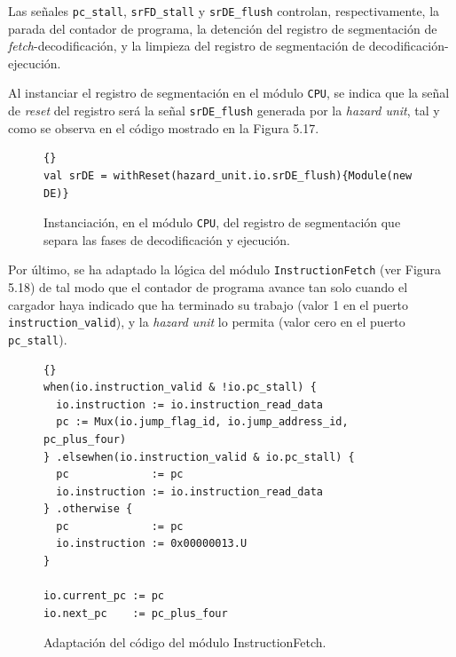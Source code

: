 Las señales \texttt{pc\_stall}, \texttt{srFD\_stall} y \texttt{srDE\_flush} controlan, respectivamente, la parada del contador de programa, la detención del registro de segmentación de \textit{fetch}-decodificación, y la limpieza del registro de segmentación de decodificación-ejecución.

Al instanciar el registro de segmentación en el módulo \texttt{CPU}, se indica que la señal de \textit{reset} del registro será la señal \texttt{srDE\_flush} generada por la \textit{hazard unit}, tal y como se observa en el código mostrado en la Figura 5.17.

\vspace{+0.4cm}
\begin{figure}[h!]
\begin{lstlisting}[style=scalaStyle,columns=fullflexible]{}
val srDE = withReset(hazard_unit.io.srDE_flush){Module(new DE)}
\end{lstlisting}
\vspace{-0.1cm}
\caption{Instanciación, en el módulo \texttt{CPU}, del registro de segmentación que separa las fases de decodificación y ejecución.}
\end{figure}

Por último, se ha adaptado la lógica del módulo \texttt{InstructionFetch} (ver Figura 5.18) de tal modo que el contador de programa avance tan solo cuando el cargador haya indicado que ha terminado su trabajo (valor 1 en el puerto \texttt{instruction\_valid}), y la \textit{hazard unit} lo permita (valor cero en el puerto \texttt{pc\_stall}).

\vspace{+0.2cm}
\begin{figure}[h!]
\begin{lstlisting}[style=scalaStyle,columns=fullflexible]{}
when(io.instruction_valid & !io.pc_stall) {
  io.instruction := io.instruction_read_data
  pc := Mux(io.jump_flag_id, io.jump_address_id, pc_plus_four)
} .elsewhen(io.instruction_valid & io.pc_stall) {
  pc             := pc
  io.instruction := io.instruction_read_data
} .otherwise {
  pc             := pc
  io.instruction := 0x00000013.U
}

io.current_pc := pc
io.next_pc    := pc_plus_four
\end{lstlisting}
\vspace{-0.1cm}
\caption{Adaptación del código del módulo InstructionFetch.}
\end{figure}

